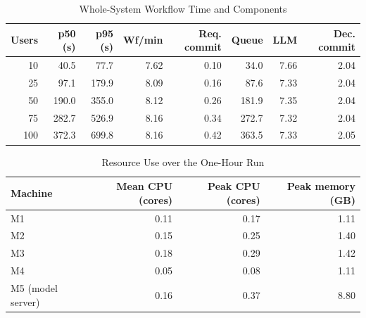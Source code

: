 \begin{table}[tb]
\centering
\caption{Whole-System Workflow Time and Components}
\label{tab:tb-system}
\footnotesize
\setlength{\tabcolsep}{2.5pt}
\begin{tabular}{@{}rrrrrrrr@{}}
\toprule
Users & p50 (s) & p95 (s) & Wf/min & Req. commit & Queue & LLM & Dec. commit \\
\midrule
10 & 40.5 & 77.7 & 7.62 & 0.10 & 34.0 & 7.66 & 2.04 \\
25 & 97.1 & 179.9 & 8.09 & 0.16 & 87.6 & 7.33 & 2.04 \\
50 & 190.0 & 355.0 & 8.12 & 0.26 & 181.9 & 7.35 & 2.04 \\
75 & 282.7 & 526.9 & 8.16 & 0.34 & 272.7 & 7.32 & 2.04 \\
100 & 372.3 & 699.8 & 8.16 & 0.42 & 363.5 & 7.33 & 2.05 \\
\bottomrule
\end{tabular}
\end{table}

\begin{table}[tb]
\centering
\caption{Resource Use over the One-Hour Run}
\label{tab:tb-hour}
\footnotesize
\begin{tabular}{@{}lrrr@{}}
\toprule
Machine & Mean CPU (cores) & Peak CPU (cores) & Peak memory (GB) \\
\midrule
M1 & 0.11 & 0.17 & 1.11 \\
M2 & 0.15 & 0.25 & 1.40 \\
M3 & 0.18 & 0.29 & 1.42 \\
M4 & 0.05 & 0.08 & 1.11 \\
M5 (model server) & 0.16 & 0.37 & 8.80 \\
\bottomrule
\end{tabular}
\end{table}

